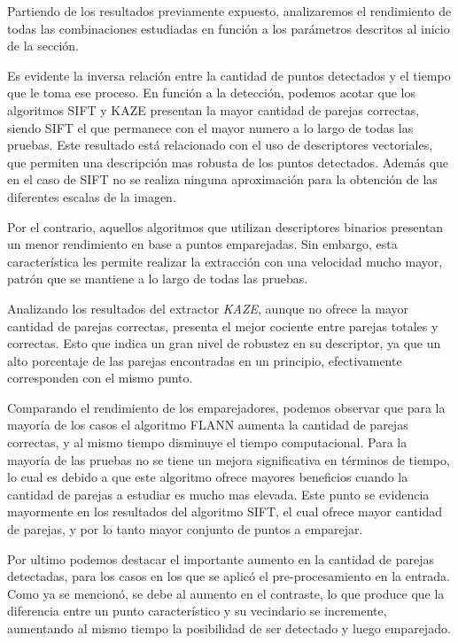 Partiendo de los resultados previamente expuesto, analizaremos el rendimiento de todas las combinaciones estudiadas en función a los parámetros descritos al inicio de la sección.

Es evidente la inversa relación entre la cantidad de puntos detectados y el tiempo que le toma ese proceso. En función a la detección, podemos acotar que los algoritmos SIFT y KAZE presentan la mayor cantidad de parejas correctas, siendo SIFT el que permanece con el mayor numero a lo largo de todas las pruebas. Este resultado está relacionado con el uso de descriptores vectoriales, que permiten una descripción mas robusta de los puntos detectados. Además que en el caso de SIFT no se realiza ninguna aproximación para la obtención de las diferentes escalas de la imagen.

Por el contrario, aquellos algoritmos que utilizan descriptores binarios presentan un menor rendimiento en base a puntos emparejadas. Sin embargo, esta característica les permite realizar la extracción con una velocidad mucho mayor, patrón que se mantiene a lo largo de todas las pruebas.

Analizando los resultados del extractor \textit{KAZE}, aunque no ofrece la mayor cantidad de parejas correctas, presenta el mejor cociente entre parejas totales y correctas. Esto que indica un gran nivel de robustez en su descriptor, ya que un alto porcentaje de las parejas encontradas en un principio, efectivamente corresponden con el mismo punto.

Comparando el rendimiento de los emparejadores, podemos observar que para la mayoría de los casos el algoritmo FLANN aumenta la cantidad de parejas correctas, y al mismo tiempo disminuye el tiempo computacional. Para la mayoría de las pruebas no se tiene un mejora significativa en términos de tiempo, lo cual es debido a que este algoritmo ofrece mayores beneficios cuando la cantidad de parejas a estudiar es mucho mas elevada. Este punto se evidencia mayormente en los resultados del algoritmo SIFT, el cual ofrece mayor cantidad de parejas, y por lo tanto mayor conjunto de puntos a emparejar.

Por ultimo podemos destacar el importante aumento en la cantidad de parejas detectadas, para los casos en los que se aplicó el pre-procesamiento en la entrada. Como ya se mencionó, se debe al aumento en el contraste, lo que produce que la diferencia entre un punto característico y su vecindario se incremente, aumentando al mismo tiempo la posibilidad de ser detectado y luego emparejado.

